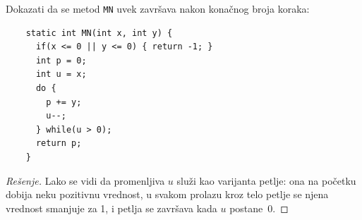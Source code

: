 \begin{EX}
  Dokazati da se metod \verb"MN" uvek zavr\v sava nakon kona\v cnog broja koraka:
{\small
\begin{verbatim}
    static int MN(int x, int y) {
      if(x <= 0 || y <= 0) { return -1; }
      int p = 0;
      int u = x;
      do {
        p += y;
        u--;
      } while(u > 0);
      return p;
    }
\end{verbatim}
}
\end{EX}
\begin{proof}[Re\v senje]
  Lako se vidi da promenljiva $u$ slu\v zi kao varijanta petlje: ona na po\v cetku dobija neku pozitivnu vrednost,
  u svakom prolazu kroz telo petlje se njena vrednost smanjuje za 1, i petlja se zavr\v sava kada $u$ postane~0.
\end{proof}


